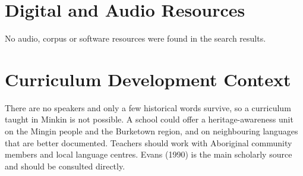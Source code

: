 \documentclass[12pt]{article}
\begin{document}
\section{Digital and Audio Resources}
No audio, corpus or software resources were found in the search results.

\section{Curriculum Development Context}
There are no speakers and only a few historical words survive, so a curriculum taught in Minkin is not possible. A school could offer a heritage-awareness unit on the Mingin people and the Burketown region, and on neighbouring languages that are better documented. Teachers should work with Aboriginal community members and local language centres. Evans (1990) is the main scholarly source and should be consulted directly.
\end{document}
